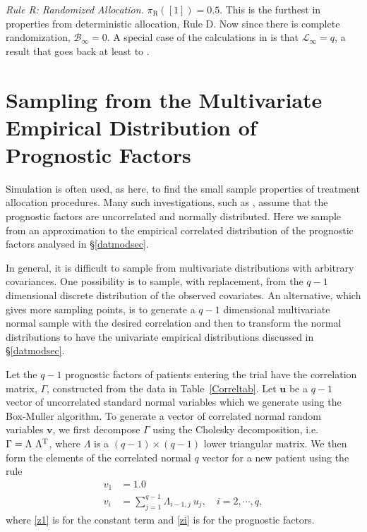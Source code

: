 \documentclass[number,12pt,review]{elsarticle}
\begin{document}
{\it Rule R: Randomized Allocation.} $\pi_{\text{R}}([1]) = 0.5 $. This is the furthest in properties from deterministic allocation, Rule D. Now since there is complete randomization, $\mathcal{B}_{\infty} =0$. A special case of the calculations in \citet{bur:96} is that $\mathcal{L}_{\infty} =q$, a result that goes back at least to \citet{cox:51}.

\section{Sampling from the Multivariate Empirical Distribution of Prognostic Factors}

\label{sampsec}

Simulation is often used, as here, to find the small sample properties of treatment allocation procedures. Many such investigations, such as \citet{aca:2002,aca:2014}, assume that the prognostic factors are uncorrelated and  normally distributed. Here we sample from an approximation to the empirical correlated distribution of the prognostic factors analysed in \S\ref{datmodsec}.

In general, it is difficult to sample from multivariate distributions with arbitrary covariances. One possibility is to sample, with replacement, from the $q-1$ dimensional discrete distribution of the observed covariates. An alternative, which gives more sampling points, is to generate a $q-1$ dimensional multivariate normal sample with the desired correlation and then to transform the normal distributions to have the univariate empirical distributions discussed in \S\ref{datmodsec}.

Let the $q-1$ prognostic factors of patients entering the trial  have the correlation matrix, $\Gamma$, constructed from the data in Table~\ref{Correltab}. Let $\pmb{u}$ be a $q-1$ vector of uncorrelated  standard normal variables which we generate using the Box-Muller algorithm. To generate a vector of  correlated normal random variables $\mathbf{v}$, we first decompose $\Gamma$ using the Cholesky decomposition, i.e.
$\Gamma=\Lambda~\Lambda^{\rm T}$, where $\Lambda$ is a $(q-1)\times (q-1)$  lower triangular matrix. We then form the elements of the correlated normal $q$ vector for a new patient using the rule
\begin{subequations}
\begin{align}
v_1&=1.0 \label{z1}\\
v_i&=\sum_{j=1}^{q-1}\Lambda_{i-1,j}~u_j, \quad i=2,\cdots,q \label{zi},
\end{align}
\label{cholesky}
\end{subequations}
\noindent where \eqref{z1} is for the constant term and \eqref{zi} is for the prognostic factors.
\end{document}
